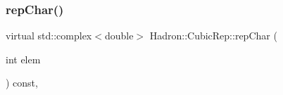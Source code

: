 \mbox{\label{structHadron_1_1CubicRep_af45227106e8e715e84b0af69cd3b36f8}} 
\subsubsection{\texorpdfstring{repChar()}{repChar()}\hspace{0.1cm}{\footnotesize\ttfamily [3/3]}}
{\footnotesize\ttfamily virtual std\+::complex$<$double$>$ Hadron\+::\+Cubic\+Rep\+::rep\+Char (\begin{DoxyParamCaption}\item[{int}]{elem }\end{DoxyParamCaption}) const\hspace{0.3cm}{\ttfamily [inline]}, {\ttfamily [virtual]}}



